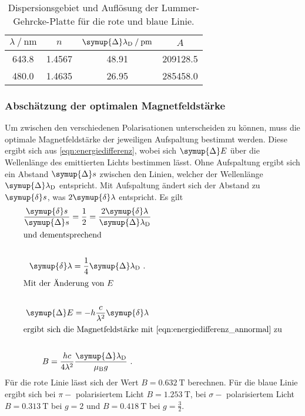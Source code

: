     \begin{table}
        \centering
        \caption{Dispersionsgebiet und Auflösung der Lummer-Gehrcke-Platte für die rote und blaue Linie.}
        \label{tab:vorb_sechs}
        \begin{tabular}{c c c c}
            \toprule
            {$\lambda \mathbin{/} \si{\nano\meter}$} & {$n$} & {$\symup{\Delta}\lambda_\text{D} \mathbin{/} \si{\pico\meter}$} & {$A$} \\
            \midrule
            643.8 & 1.4567 & 48.91 & 209128.5 \\ %
            480.0 & 1.4635 & 26.95 & 285458.0 \\
            \bottomrule
        \end{tabular}
    \end{table}

\subsubsection{Abschätzung der optimalen Magnetfeldstärke}
\label{sec:vorb_magnetfeldstaerke}

    Um zwischen den verschiedenen Polarisationen unterscheiden zu können,
    muss die optimale Magnetfeldstärke der jeweiligen Aufspaltung bestimmt werden.
    Diese ergibt sich aus \autoref{eqn:energiedifferenz},
    wobei sich $\symup{\Delta} E$ über die Wellenlänge des emittierten Lichts bestimmen lässt.
    Ohne Aufspaltung ergibt sich ein Abstand $\symup{\Delta} s$ zwischen den Linien,
    welcher der Wellenlänge $\symup{\Delta} \lambda_\text{D}$ entspricht.
    Mit Aufspaltung ändert sich der Abstand zu $\symup{\delta} s$,
    was $2 \symup{\delta} \lambda$ entspricht.
    Es gilt
    \begin{gather*}
        \frac{\symup{\delta} s}{\symup{\Delta} s} = \frac{1}{2} = \frac{2 \symup{\delta} \lambda}{\symup{\Delta} \lambda_\text{D}} \\
        \intertext{und dementsprechend} \\
        \symup{\delta} \lambda = \frac{1}{4} \symup{\Delta} \lambda_\text{D} \ . \\
        \intertext{Mit der Änderung von $E$} \\
        \symup{\Delta} E = - h \frac{c}{\lambda^2} \symup{\delta} \lambda \\
        \intertext{ergibt sich die Magnetfeldstärke mit \autoref{eqn:energiedifferenz_annormal} zu} \\
        B = \frac{h c}{4 \lambda^2} \frac{\symup{\Delta} \lambda_\text{D}}{\mu_\text{B} g} \ .
    \end{gather*}
    Für die rote Linie lässt sich der Wert $B = \SI{0.632}{\tesla}$ berechnen.
    Für die blaue Linie ergibt sich bei $\pi-$ polarisiertem Licht $B = \SI{1.253}{\tesla}$,
    bei $\sigma-$ polarisiertem Licht $B = \SI{0.313}{\tesla}$ bei $g=2$ und $B = \SI{0.418}{\tesla}$ bei $g=\frac{3}{2}$.
            


